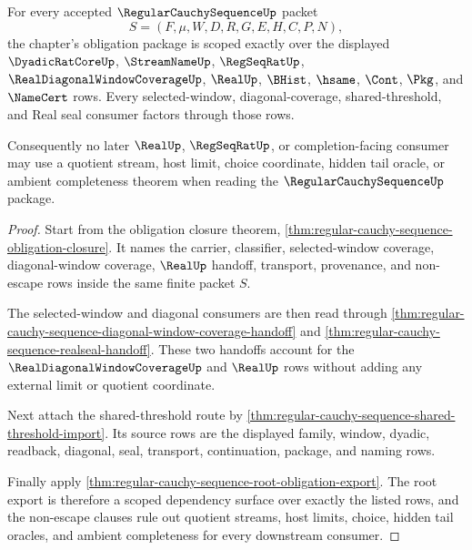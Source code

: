 \begin{theorem}
\label{thm:regular-cauchy-sequence-scope-dependency-surface}
For every accepted $\RegularCauchySequenceUp$ packet
$$
S=(F,\mu,W,D,R,G,E,H,C,P,N),
$$
the chapter's obligation package is scoped exactly over the displayed $\DyadicRatCoreUp$, $\StreamNameUp$, $\RegSeqRatUp$, $\RealDiagonalWindowCoverageUp$, $\RealUp$, $\BHist$, $\hsame$, $\Cont$, $\Pkg$, and $\NameCert$ rows. Every selected-window, diagonal-coverage, shared-threshold, and Real seal consumer factors through those rows.

Consequently no later $\RealUp$, $\RegSeqRatUp$, or completion-facing consumer may use a quotient stream, host limit, choice coordinate, hidden tail oracle, or ambient completeness theorem when reading the $\RegularCauchySequenceUp$ package.
\end{theorem}
\begin{proof}
Start from the obligation closure theorem, \autoref{thm:regular-cauchy-sequence-obligation-closure}. It names the carrier, classifier, selected-window coverage, diagonal-window coverage, $\RealUp$ handoff, transport, provenance, and non-escape rows inside the same finite packet $S$.

The selected-window and diagonal consumers are then read through \autoref{thm:regular-cauchy-sequence-diagonal-window-coverage-handoff} and \autoref{thm:regular-cauchy-sequence-realseal-handoff}. These two handoffs account for the $\RealDiagonalWindowCoverageUp$ and $\RealUp$ rows without adding any external limit or quotient coordinate.

Next attach the shared-threshold route by \autoref{thm:regular-cauchy-sequence-shared-threshold-import}. Its source rows are the displayed family, window, dyadic, readback, diagonal, seal, transport, continuation, package, and naming rows.

Finally apply \autoref{thm:regular-cauchy-sequence-root-obligation-export}. The root export is therefore a scoped dependency surface over exactly the listed rows, and the non-escape clauses rule out quotient streams, host limits, choice, hidden tail oracles, and ambient completeness for every downstream consumer.
\end{proof}

